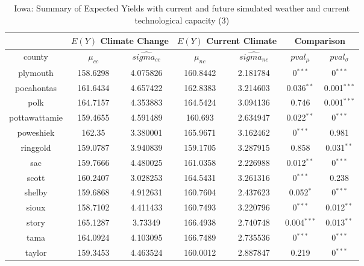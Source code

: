\begin{table}[]
\caption{Iowa: Summary of Expected Yields with current and future simulated weather and current technological capacity (3)}
\label{my-label}
\begin{tabular}{|c|cc|cc|cc|}
\hline
\multicolumn{1}{|c}{} & \multicolumn{2}{|c}{$E(Y)$ Climate Change} & \multicolumn{2}{|c}{$E(Y)$ Current Climate} & \multicolumn{2}{|c|}{Comparison}\\ 
\hline
county        & $\mu_{cc}$ & $\hat{sigma_{cc}}$ & $\mu_{nc}$ & $\hat{sigma_{nc}}$ & $pval_{\mu}$ & $pval_{\sigma}$ \\
\hline
plymouth      & 158.6298  & 4.075826          & 160.8442  & 2.181784          & 0$^{***}$     & 0$^{***}$     \\
pocahontas    & 161.6434  & 4.657422          & 162.8383  & 3.214603          & 0.036$^{**}$  & 0.001$^{***}$ \\
polk          & 164.7157  & 4.353883          & 164.5424  & 3.094136          & 0.746                         & 0.001$^{***}$ \\
pottawattamie & 159.4655  & 4.591489          & 160.693   & 2.634947          & 0.022$^{**}$  & 0$^{***}$     \\
poweshiek     & 162.35    & 3.380001          & 165.9671  & 3.162462          & 0$^{***}$     & 0.981                         \\
ringgold      & 159.0787  & 3.940839          & 159.1705  & 3.287915          & 0.858                         & 0.031$^{**}$  \\
sac           & 159.7666  & 4.480025          & 161.0358  & 2.226988          & 0.012$^{**}$  & 0$^{***}$     \\
scott         & 160.2407  & 3.028253          & 164.5431  & 3.261316          & 0$^{***}$     & 0.238                         \\
shelby        & 159.6868  & 4.912631          & 160.7604  & 2.437623          & 0.052$^{*}$   & 0$^{***}$     \\
sioux         & 158.7102  & 4.411433          & 160.7493  & 3.220796          & 0$^{***}$     & 0.012$^{**}$  \\
story         & 165.1287  & 3.73349           & 166.4938  & 2.740748          & 0.004$^{***}$ & 0.013$^{**}$  \\
tama          & 164.0924  & 4.103095          & 166.7489  & 2.735536          & 0$^{***}$     & 0$^{***}$     \\
taylor        & 159.3453  & 4.463524          & 160.0012  & 2.887847          & 0.219                         & 0$^{***}$     \\

\end{tabular}
\end{table}
